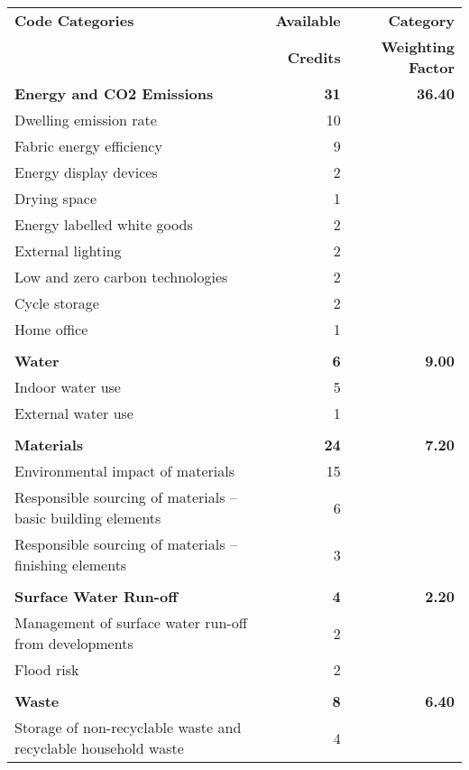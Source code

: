 \documentclass[a4paper,fleqn]{article}
\makeatletter
\newcommand{\ie}{\emph{i.e.,\@\xspace}}
\makeatother
\begin{document}
\begin{longtable}[H]{| l | r | r |}
	\hline
	\textbf{Code Categories} & \textbf{Available} & \textbf{Category}\\
	& \textbf{Credits} & \textbf{Weighting Factor}\\
	
	\hline
	\endhead %
	
	\hline
	\endfoot %
	
	\endlastfoot %
	\textbf{Energy and CO2 Emissions} & \textbf{31} & \textbf{36.40}\\*
	Dwelling emission rate & 10 &\\*
	Fabric energy efficiency & 9 &\\*
	Energy display devices & 2 &\\*
	Drying space & 1 &\\*
	Energy labelled white goods & 2 &\\*
	External lighting & 2 &\\*
	Low and zero carbon technologies & 2 &\\*
	Cycle storage & 2 &\\*
	Home office & 1 &\\*
	& &\\
	\textbf{Water} & \textbf{6} & \textbf{9.00}\\*
	Indoor water use & 5 &\\*
	External water use & 1 &\\*
	& &\\
	\textbf{Materials} & \textbf{24} & \textbf{7.20}\\*
	Environmental impact of materials & 15 &\\*
	Responsible sourcing of materials – basic building elements & 6 &\\*
	Responsible sourcing of materials – finishing elements & 3 &\\*
	& & \\*
	\textbf{Surface Water Run-off} & \textbf{4} & \textbf{2.20}\\*
	Management of surface water run-off from developments & 2 &\\*
	Flood risk & 2 &\\*
	& & \\
	\textbf{Waste} & \textbf{8} & \textbf{6.40} \\*
	Storage of non-recyclable waste and recyclable household waste & 4 & \\*

\end{longtable}
\end{document}
